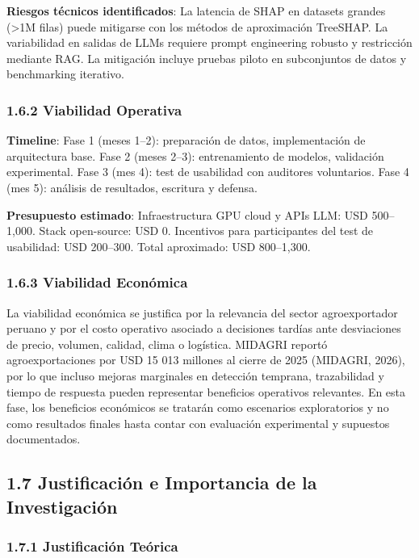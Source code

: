 \textbf{Riesgos técnicos identificados}: La latencia de SHAP en datasets
grandes (\textgreater1M filas) puede mitigarse con los métodos de
aproximación TreeSHAP. La variabilidad en salidas de LLMs requiere
prompt engineering robusto y restricción mediante RAG. La mitigación
incluye pruebas piloto en subconjuntos de datos y benchmarking
iterativo.

\subsubsection{1.6.2 Viabilidad Operativa}\label{viabilidad-operativa}

\textbf{Timeline}: Fase 1 (meses 1--2): preparación de datos,
implementación de arquitectura base. Fase 2 (meses 2--3): entrenamiento
de modelos, validación experimental. Fase 3 (mes 4): test de usabilidad
con auditores voluntarios. Fase 4 (mes 5): análisis de resultados,
escritura y defensa.

\textbf{Presupuesto estimado}: Infraestructura GPU cloud y APIs LLM: USD
500--1,000. Stack open-source: USD 0. Incentivos para participantes del
test de usabilidad: USD 200--300. Total aproximado: USD 800--1,300.

\subsubsection{1.6.3 Viabilidad
Económica}\label{viabilidad-econuxf3mica}

La viabilidad económica se justifica por la relevancia del sector
agroexportador peruano y por el costo operativo asociado a decisiones
tardías ante desviaciones de precio, volumen, calidad, clima o
logística. MIDAGRI reportó agroexportaciones por USD 15 013 millones al
cierre de 2025 (MIDAGRI, 2026), por lo que incluso mejoras marginales en
detección temprana, trazabilidad y tiempo de respuesta pueden
representar beneficios operativos relevantes. En esta fase, los
beneficios económicos se tratarán como escenarios exploratorios y no
como resultados finales hasta contar con evaluación experimental y
supuestos documentados.

\subsection{1.7 Justificación e Importancia de la
Investigación}\label{justificaciuxf3n-e-importancia-de-la-investigaciuxf3n}

\subsubsection{1.7.1 Justificación
Teórica}\label{justificaciuxf3n-teuxf3rica}

